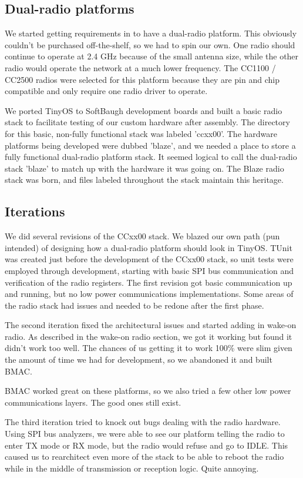 \documentclass{article}
\begin{document}
\subsection{Dual-radio platforms}
We started getting requirements in to have a dual-radio platform.  This obviously couldn't be purchased off-the-shelf,
so we had to spin our own. One radio should continue to operate at 2.4 GHz because of the small antenna size, 
while the other radio would operate the network at a much lower frequency.  The CC1100 / CC2500 radios 
were selected for this platform because they are pin and chip compatible and only require one radio driver to operate.

We ported TinyOS to SoftBaugh development boards and built a basic radio stack to facilitate testing
of our custom hardware after assembly.  The directory for this basic, non-fully functional stack was labeled 'ccxx00'.
The hardware platforms being developed were dubbed 'blaze', and we needed a place to store a fully functional
dual-radio platform stack. It seemed logical to call the dual-radio stack 'blaze' to match up with the hardware
it was going on.  The Blaze radio stack was born, and files labeled throughout the stack maintain this heritage.

\subsection{Iterations}
We did several revisions of the CCxx00 stack.  We blazed our own path (pun intended) of designing how a dual-radio platform
should look in TinyOS. TUnit was created just before the development of the CCxx00 stack, so unit tests were employed
through development, starting with basic SPI bus communication and verification of the radio registers. 
The first revision got basic communication up and running, but no low power communications implementations. Some areas of the radio stack had issues and needed to be redone after the first phase.  

The second iteration fixed the architectural issues and started adding in wake-on radio. As described in the
wake-on radio section, we got it working but found it didn't work too well. The chances of us getting it to work
100\% were slim given the amount of time we had for development, so we abandoned it and built BMAC. 

BMAC worked great on these platforms, so we also tried a few other low power communications layers. The good
ones still exist.

The third iteration tried to knock out bugs dealing with the radio hardware. Using SPI bus analyzers, we
were able to see our platform telling the radio to enter TX mode or RX mode, but the radio would refuse and go 
to IDLE.  This caused us to rearchitect even more of the stack to be able to reboot the radio while in the
middle of transmission or reception logic. Quite annoying.
\end{document}
